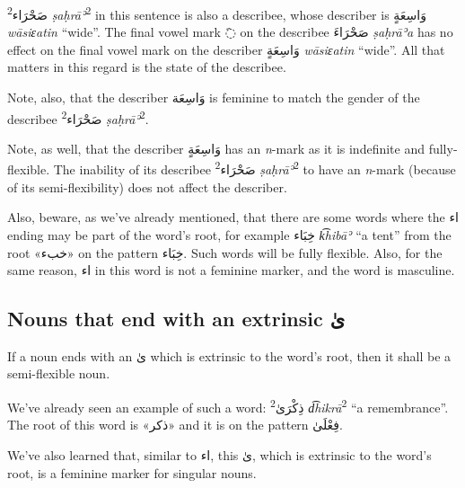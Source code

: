 \documentclass[
  10pt,
]{book}
\begin{document}
\textsuperscript{2}\foreignlanguage{arabic}{صَحْرَاء} \emph{ṣaḥrāʾ}\textsuperscript{2} in this sentence
is also a describee, whose describer is \foreignlanguage{arabic}{وَاسِعَةٍ} \emph{wāsiɛatin} \enquote{wide}. The final vowel mark \foreignlanguage{arabic}{◌َ} on the describee \foreignlanguage{arabic}{صَحْرَاءَ} \emph{ṣaḥrāʾa} has no effect on the final vowel mark on the describer \foreignlanguage{arabic}{وَاسِعَةٍ} \emph{wāsiɛatin} \enquote{wide}. All that matters in this regard is the state of the describee.

Note, also, that the describer \foreignlanguage{arabic}{وَاسِعَة} is feminine to match the gender of the describee
\textsuperscript{2}\foreignlanguage{arabic}{صَحْرَاء} \emph{ṣaḥrāʾ}\textsuperscript{2}.

Note, as well, that the describer \foreignlanguage{arabic}{وَاسِعَةٍ} has an \emph{n}-mark as it is indefinite and fully-flexible. The inability of its describee
\textsuperscript{2}\foreignlanguage{arabic}{صَحْرَاء} \emph{ṣaḥrāʾ}\textsuperscript{2}
to have an \emph{n}-mark (because of its semi-flexibility) does not affect the describer.

Also, beware, as we've already mentioned, that there are some words where the \foreignlanguage{arabic}{اء} ending may be part of the word's root, for example
\foreignlanguage{arabic}{خِبَاء} \emph{k͡hibāʾ} \enquote{a tent} from the root \foreignlanguage{arabic}{«خبء»} on the pattern \foreignlanguage{arabic}{خِبَاء}. Such words will be fully flexible.
Also, for the same reason, \foreignlanguage{arabic}{اء} in this word is not a feminine marker, and the word is masculine.

\subsection{\texorpdfstring{Nouns that end with an extrinsic \foreignlanguage{arabic}{ىٰ}}{Nouns that end with an extrinsic ىٰ}}\label{nouns-that-end-with-an-extrinsic-ux649}

If a noun ends with an \foreignlanguage{arabic}{ىٰ} which is extrinsic to the word's root, then it shall be a semi-flexible noun.

We've already seen an example of such a word: \textsuperscript{2}\foreignlanguage{arabic}{ذِکْرَىٰ} \emph{d͡hikrā}\textsuperscript{2} \enquote{a remembrance}. The root of this word is \foreignlanguage{arabic}{«ذکر»} and it is on the pattern \foreignlanguage{arabic}{فِعْلَىٰ}.

We've also learned that, similar to \foreignlanguage{arabic}{اء}, this \foreignlanguage{arabic}{ىٰ}, which is extrinsic to the word's root, is a feminine marker for singular nouns.
\end{document}
